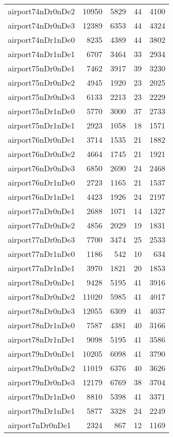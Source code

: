 \begin{longtable}{lrrrr}
airport74nDr0nDe2 & 10950 & 5829 & 44 & 4100 \\
airport74nDr0nDe3 & 12389 & 6353 & 44 & 4324 \\
airport74nDr1nDe0 & 8235 & 4389 & 44 & 3802 \\
airport74nDr1nDe1 & 6707 & 3464 & 33 & 2934 \\
airport75nDr0nDe1 & 7462 & 3917 & 39 & 3230 \\
airport75nDr0nDe2 & 4945 & 1920 & 23 & 2025 \\
airport75nDr0nDe3 & 6133 & 2213 & 23 & 2229 \\
airport75nDr1nDe0 & 5770 & 3000 & 37 & 2733 \\
airport75nDr1nDe1 & 2923 & 1058 & 18 & 1571 \\
airport76nDr0nDe1 & 3714 & 1535 & 21 & 1882 \\
airport76nDr0nDe2 & 4664 & 1745 & 21 & 1921 \\
airport76nDr0nDe3 & 6850 & 2690 & 24 & 2468 \\
airport76nDr1nDe0 & 2723 & 1165 & 21 & 1537 \\
airport76nDr1nDe1 & 4423 & 1926 & 24 & 2197 \\
airport77nDr0nDe1 & 2688 & 1071 & 14 & 1327 \\
airport77nDr0nDe2 & 4856 & 2029 & 19 & 1831 \\
airport77nDr0nDe3 & 7700 & 3474 & 25 & 2533 \\
airport77nDr1nDe0 & 1186 & 542 & 10 & 634 \\
airport77nDr1nDe1 & 3970 & 1821 & 20 & 1853 \\
airport78nDr0nDe1 & 9428 & 5195 & 41 & 3916 \\
airport78nDr0nDe2 & 11020 & 5985 & 41 & 4017 \\
airport78nDr0nDe3 & 12055 & 6309 & 41 & 4037 \\
airport78nDr1nDe0 & 7587 & 4381 & 40 & 3166 \\
airport78nDr1nDe1 & 9098 & 5195 & 41 & 3586 \\
airport79nDr0nDe1 & 10205 & 6098 & 41 & 3790 \\
airport79nDr0nDe2 & 11019 & 6376 & 40 & 3626 \\
airport79nDr0nDe3 & 12179 & 6769 & 38 & 3704 \\
airport79nDr1nDe0 & 8810 & 5398 & 41 & 3371 \\
airport79nDr1nDe1 & 5877 & 3328 & 24 & 2249 \\
airport7nDr0nDe1 & 2324 & 867 & 12 & 1169 \\

\end{longtable}
